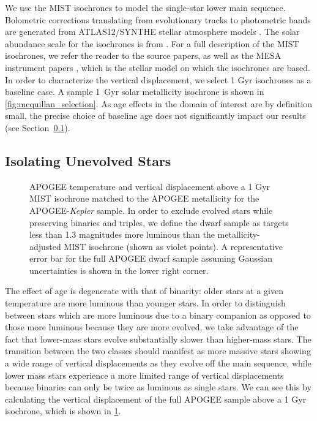 \documentclass[twocolumn]{aastex6}
\newcommand{\Kepler}{\mbox{\textit{Kepler}}}
\begin{document}
We use the MIST \citep{Dotter16,Choi16} isochrones to model the 
single-star lower main sequence. Bolometric corrections translating from
evolutionary tracks to photometric bands are generated from ATLAS12/SYNTHE
stellar atmosphere models \citep{Kurucz70,Kurucz93}. The solar abundance scale
for the isochrones is from \citet{Asplund09}. For a full description of the 
MIST isochrones, we refer the reader to the source papers, as well as the MESA 
instrument papers \citep{Paxton11, Paxton13, Paxton15}, which is the stellar 
model on which the isochrones are based. In order to characterize the vertical 
displacement, we select 1 Gyr isochrones
as a baseline case. A sample 1~Gyr solar metallicity isochrone is shown in
\cref{fig:mcquillan_selection}. As age effects in the domain of interest are 
by definition small, the precise choice of baseline age does not significantly impact our 
results (see Section~\ref{sec:age}).

\subsection{Isolating Unevolved Stars}
\label{sec:age}

\begin{figure}[htb]
    \centering
    \caption{APOGEE temperature and vertical displacement above a 1 Gyr MIST 
        isochrone matched to the APOGEE metallicity for the APOGEE-\Kepler{} 
        sample.  In order to exclude evolved stars while preserving binaries 
        and triples, we define the dwarf sample as targets less than 1.3 
        magnitudes more luminous than the metallicity-adjusted MIST isochrone 
        (shown as violet points). A representative error bar for the 
        full APOGEE dwarf sample assuming Gaussian uncertainties is shown in 
        the lower right corner.}\label{fig:sample_dk}
\end{figure}

The effect of age is degenerate with that of binarity: older stars at a given
temperature are more luminous than younger stars. In order to distinguish
between stars which are more luminous due to a binary companion as opposed to
those more luminous because they are more evolved, we take advantage of the fact that
lower-mass stars evolve substantially slower than higher-mass stars. The
transition between the two classes should manifest as more massive stars
showing a wide range of vertical displacements as they evolve off the main
sequence, while lower mass stars experience a more limited range of vertical
displacements because binaries can only be twice as luminous as single stars. 
We can see this by calculating the vertical displacement of the full APOGEE 
sample above a 1 Gyr isochrone, which is shown in \cref{fig:sample_dk}. 
\end{document}
